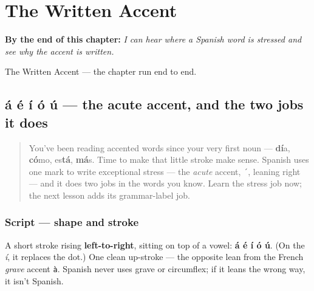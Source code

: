 
\chapter{The Written Accent}
\label{ch:written-accent}

\begin{chapteropening}
\textbf{By the end of this chapter:} \emph{I can hear where a Spanish word is stressed and see why the accent is written.}

The Written Accent — the chapter run end to end.
\end{chapteropening}

\section[á é í ó ú]{á é í ó ú — the acute accent, and the two jobs it does}

\label{lesson:ES-W01-acento}



\begin{quote}
You've been reading accented words since your very first noun — \textbf{dí}a, \textbf{có}mo, es\textbf{tá}, \textbf{má}s. Time to make that little stroke make sense. Spanish uses one mark to write exceptional stress — the \emph{acute} accent, \texttt{´}, leaning right — and it does two jobs in the words you know. Learn the stress job now; the next lesson adds its grammar-label job.
\end{quote}

\subsection*{Script — shape and stroke}
A short stroke rising \textbf{left-to-right}, sitting on top of a vowel: \textbf{á é í ó ú}. (On the \emph{í}, it replaces the dot.) One clean up-stroke — the opposite lean from the French \emph{grave} accent \texttt{à}. Spanish never uses grave or circumflex; if it leans the wrong way, it isn't Spanish.

